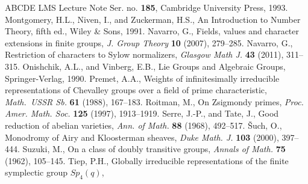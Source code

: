 \documentclass[11pt]{amsart}
\theoremstyle{plain}
\theoremstyle{definition}
\numberwithin{thm}{section}
\numberwithin{equation}{thm}
\newcommand{\0}{\emptyset}
\begin{document}
\begin{thebibliography}{ABCDE}
  LMS Lecture Note Ser. no. {\bf 185}, 
  Cambridge University Press, 1993.
\medskip
{}
  Montgomery, H.L., Niven, I., and Zuckerman, H.S., An Introduction to Number Theory, fifth ed., Wiley \& Sons, 1991.
\medskip  
{}
  Navarro, G., Fields, values and character extensions in finite groups, {\it J. Group Theory} {\bf 10} (2007), 279--285.  
\medskip  
{}
  Navarro, G., Restriction of characters to Sylow normalizers, {\it Glasgow Math J.} {\bf 43} (2011), 311--315. 
\medskip
{}
  Onishchik, A.L., and Vinberg, E.B., Lie Groups and Algebraic Groups, Springer-Verlag, 1990.
\medskip
{}
  Premet, A.A., Weights of infinitesimally irreducible representations 
of Chevalley groups over a field of prime characteristic, {\it Math.\ 
USSR Sb.} {\bf 61} (1988),  167--183.
\medskip
{}
  Roitman, M., On Zsigmondy primes, {\it Proc. Amer. Math. Soc.} {\bf 125} (1997), 1913--1919.
\medskip
{} Serre, J.-P., and Tate, J., Good reduction of abelian varieties, {\it Ann. of Math.} {\bf 88} (1968), 492--517.
\medskip
\medskip
{}\v{S}uch, O., Monodromy of Airy and Kloosterman sheaves, {\it Duke Math. J.} {\bf 103} (2000), 397--444.
\medskip
{}
  Suzuki, M., On a class of doubly transitive groups, {\it Annals of Math.} {\bf 75} (1962),  105--145.
\medskip
{}
  Tiep, P.H., Globally irreducible representations of the finite symplectic group $Sp_{4}(q)$,

\end{thebibliography}
\end{document}
